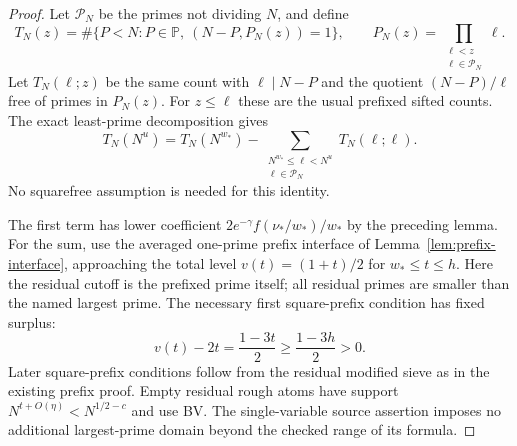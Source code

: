 \documentclass[11pt]{article}
\newcommand{\PP}{\mathbb P}
\begin{document}
\begin{proof}
Let $\mathcal P_N$ be the primes not dividing $N$, and define
\[
 T_N(z)=\#\{P<N:P\in\PP,\ (N-P,P_N(z))=1\},
 \qquad P_N(z)=\prod_{\substack{\ell<z\\\ell\in\mathcal P_N}}\ell.
\]
Let $T_N(\ell;z)$ be the same count with $\ell\mid N-P$
and the quotient $(N-P)/\ell$ free of primes in $P_N(z)$.
For $z\le\ell$ these are the usual prefixed sifted counts.
The exact least-prime decomposition gives
\begin{equation}\label{eq:buchstab-restricted-identity}
 T_N(N^u)=T_N(N^{w_*})
  -\sum_{\substack{N^{w_*}\le\ell<N^u\\\ell\in\mathcal P_N}}
                       T_N(\ell;\ell).
\end{equation}
No squarefree assumption is needed for this identity.

The first term has lower coefficient
$2e^{-\gamma}f(\nu_*/w_*)/w_*$ by the preceding lemma.
For the sum, use the averaged one-prime prefix interface
of Lemma~\ref{lem:prefix-interface}, approaching the total level
$v(t)=(1+t)/2$ for $w_*\le t\le h$.
Here the residual cutoff is the prefixed prime itself;
all residual primes are smaller than the named largest prime.
The necessary first square-prefix condition has fixed surplus:
\[
 v(t)-2t=\frac{1-3t}{2}\ge\frac{1-3h}{2}>0.
\]
Later square-prefix conditions follow from the residual
modified sieve as in the existing prefix proof. Empty residual
rough atoms have support $N^{t+O(\eta)}<N^{1/2-c}$ and use BV.
The single-variable source assertion imposes no additional
largest-prime domain beyond the checked range of its formula.


\end{proof}
\end{document}
